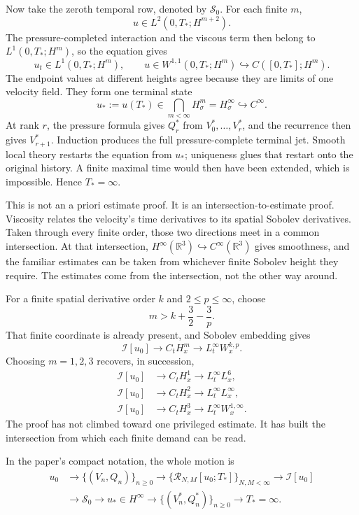\documentclass[12pt]{article}
\newcommand{\R}{\mathbb R}
\newcommand{\I}{\mathcal I}
\newcommand{\cR}{\mathcal R}
\newcommand{\Szero}{\mathscr S_0}
\begin{document}
Now take the zeroth temporal row, denoted by \(\Szero\). For each finite \(m\),
\[
  u\in L^2(0,T_*;H^{m+2}).
\]
The pressure-completed interaction and the viscous term then belong to
\(L^1(0,T_*;H^m)\), so the equation gives
\[
  u_t\in L^1(0,T_*;H^m),
  \qquad
  u\in W^{1,1}(0,T_*;H^m)
  \hookrightarrow C([0,T_*];H^m).
\]
The endpoint values at different heights agree because they are limits of one
velocity field. They form one terminal state
\[
  u_*:=u(T_*)\in\bigcap_{m<\infty}H_\sigma^m
  =
  H_\sigma^\infty
  \hookrightarrow C^\infty.
\]
At rank \(r\), the pressure formula gives \(Q_r^*\) from
\(V_0^*,\ldots,V_r^*\), and the recurrence then gives \(V_{r+1}^*\).
Induction produces the full pressure-complete terminal jet. Smooth local theory
restarts the equation from \(u_*\); uniqueness glues that restart onto the
original history. A finite maximal time would then have been extended, which
is impossible. Hence \(T_*=\infty\).

This is not an a priori estimate proof. It is an intersection-to-estimate
proof. Viscosity relates the velocity's time derivatives to its spatial
Sobolev derivatives. Taken through every finite order, those two directions
meet in a common intersection. At that intersection,
\(H^\infty(\R^3)\hookrightarrow C^\infty(\R^3)\) gives smoothness, and the
familiar estimates can be taken from whichever finite Sobolev height they
require. The estimates come from the intersection, not the other way around.

For a finite spatial derivative order \(k\) and \(2\leq p\leq\infty\), choose
\[
  m>k+\frac32-\frac3p.
\]
That finite coordinate is already present, and Sobolev embedding gives
\[
  \I[u_0]
  \longrightarrow
  C_tH_x^m
  \longrightarrow
  L_t^\infty W_x^{k,p}.
\]
Choosing \(m=1,2,3\) recovers, in succession,
\[
\begin{aligned}
  \I[u_0]&\longrightarrow C_tH_x^1
    \longrightarrow L_t^\infty L_x^6,\\
  \I[u_0]&\longrightarrow C_tH_x^2
    \longrightarrow L_t^\infty L_x^\infty,\\
  \I[u_0]&\longrightarrow C_tH_x^3
    \longrightarrow L_t^\infty W_x^{1,\infty}.
\end{aligned}
\]
The proof has not climbed toward one privileged estimate. It has built the
intersection from which each finite demand can be read.

In the paper's compact notation, the whole motion is
\[
\begin{aligned}
  u_0
  &\longrightarrow
  \{(V_n,Q_n)\}_{n\geq0}
  \longrightarrow
  \{\cR_{N,M}[u_0;T_*]\}_{N,M<\infty}
  \longrightarrow
  \I[u_0]\\
  &\longrightarrow
  \Szero
  \longrightarrow
  u_*\in H^\infty
  \longrightarrow
  \{(V_n^*,Q_n^*)\}_{n\geq0}
  \longrightarrow
  T_*=\infty.
\end{aligned}
\]
\end{document}
